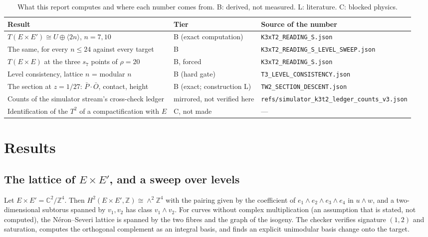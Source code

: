 \documentclass[11pt,a4paper]{article}
\theoremstyle{remark}
\begin{document}
\begin{table}[h]
\centering\footnotesize
\begin{tabular}{p{5.4cm}p{3.4cm}p{5.4cm}}
\toprule
Result & Tier & Source of the number \\
\midrule
$T(E\times E')\cong U\oplus\langle 2n\rangle$, $n=7,10$ & B (exact computation) & \nolinkurl{K3xT2_READING_S.json} \\
The same, for every $n\le24$ against every target & B & \nolinkurl{K3xT2_READING_S_LEVEL_SWEEP.json} \\
$T(E\times E)$ at the three $s_7$ points of $\rho=20$ & B, forced & \nolinkurl{K3xT2_READING_S.json} \\
Level consistency, lattice $n$ = modular $n$ & B (hard gate) & \nolinkurl{T3_LEVEL_CONSISTENCY.json} \\
The section at $z=1/27$: $\bar P\cdot\bar O$, contact, height & B (exact; construction L) & \nolinkurl{TW2_SECTION_DESCENT.json} \\
Counts of the simulator stream's cross-check ledger & mirrored, not verified here & \nolinkurl{refs/simulator_k3t2_ledger_counts_v3.json} \\
Identification of the $T^2$ of a compactification with $E$ & C, not made & --- \\
\bottomrule
\end{tabular}
\caption{What this report computes and where each number comes from. B: derived, not measured. L: literature. C: blocked physics.}\label{tab:map}
\end{table}

\section{Results}\label{sec:results}

\subsection{The lattice of $E\times E'$, and a sweep over levels}\label{sec:lattice}

Let $E\times E'=\mathbb{C}^2/\mathbb{Z}^4$. Then $H^2(E\times E',\mathbb{Z})\cong\wedge^2\mathbb{Z}^4$ with the pairing given by the
coefficient of $e_1\wedge e_2\wedge e_3\wedge e_4$ in $u\wedge w$, and a two-dimensional subtorus spanned by $v_1,v_2$ has class
$v_1\wedge v_2$. For curves without complex multiplication (an assumption that is stated, not computed), the N\'eron--Severi lattice is
spanned by the two fibres and the graph of the isogeny. The checker verifies signature $(1,2)$ and saturation, computes the
orthogonal complement as an integral basis, and finds an explicit unimodular basis change onto the target.
\end{document}
